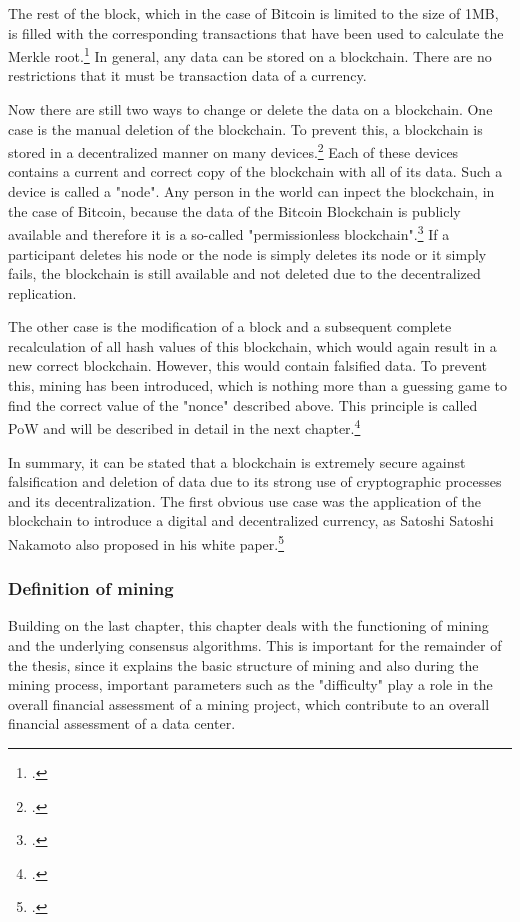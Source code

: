 The rest of the block, which in the case of Bitcoin is limited to the size of 1MB, is filled with the corresponding
transactions that have been used to calculate the Merkle root.\footcite[Cf.][p. 746]{mukhopadhyay2016brief}
In general, any data can be stored on a blockchain. There are no restrictions that
it must be transaction data of a currency.

Now there are still two ways to change or delete the data on a blockchain. One case
is the manual deletion of the blockchain. To prevent this, a blockchain is stored in a decentralized manner on many
devices.\footcite[Cf.][p. 46]{bhaskar2015bitcoin} Each of these devices contains a current and correct copy
of the blockchain with all of its data. Such a device is called a "node". Any person in the world can inpect the blockchain, in the case of
Bitcoin, because the data of the Bitcoin Blockchain is publicly available and therefore it is a so-called "permissionless blockchain".\footcite[Cf.][p. 132]{courtois2014optimizing}
If a participant deletes his node or the node is simply
deletes its node or it simply fails, the blockchain is still available and not deleted due to the decentralized replication.

The other case is the modification of a block and a subsequent complete recalculation of all hash values of this blockchain,
which would again result in a new correct blockchain. However, this would contain falsified data.
To prevent this, mining has been introduced, which is nothing more than a guessing game to find the
correct value of the "nonce" described above. This principle is called \ac{PoW} and will be described in detail in the next chapter.\footcite[Cf.][p. 3]{nakamoto2008bitcoin}

In summary, it can be stated that a blockchain is extremely secure against falsification and deletion of data due to its
strong use of cryptographic processes and its decentralization.
The first obvious use case was the application of the blockchain to introduce a digital and decentralized currency, as Satoshi
Satoshi Nakamoto also proposed in his white paper.\footcite[Cf.][]{nakamoto2008bitcoin}

\subsubsection{Definition of mining} \label{toc:miningundkonsensalgorithmen}

Building on the last chapter, this chapter deals with the functioning of mining and the underlying consensus algorithms.
This is important for the remainder of the thesis, since it explains the basic structure of mining
and also during the mining process, important parameters such as the "difficulty" play a role in the overall financial assessment of a mining project,
which contribute to an overall financial assessment of a data center.

